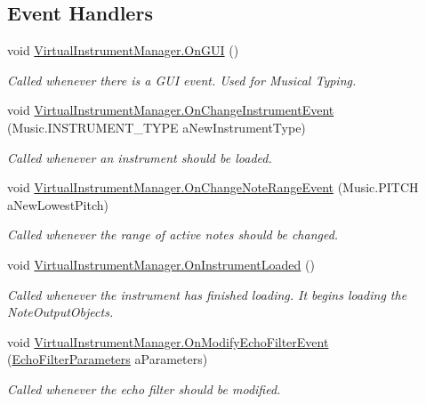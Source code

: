 \subsection*{Event Handlers}
\begin{DoxyCompactItemize}
\item 
void \hyperlink{group___virtual_instrument_manager_event_types_gac64ceff10f8db3a11868f251cea72349}{Virtual\+Instrument\+Manager.\+On\+G\+UI} ()
\begin{DoxyCompactList}\small\item\em Called whenever there is a G\+UI event. Used for Musical Typing. \end{DoxyCompactList}\item 
void \hyperlink{group___virtual_instrument_manager_event_types_ga8e79286073756c31e08fecd59ce04fa7}{Virtual\+Instrument\+Manager.\+On\+Change\+Instrument\+Event} (Music.\+I\+N\+S\+T\+R\+U\+M\+E\+N\+T\+\_\+\+T\+Y\+PE a\+New\+Instrument\+Type)
\begin{DoxyCompactList}\small\item\em Called whenever an instrument should be loaded. \end{DoxyCompactList}\item 
void \hyperlink{group___virtual_instrument_manager_event_types_ga660c766dceebfc830de2cf96686692df}{Virtual\+Instrument\+Manager.\+On\+Change\+Note\+Range\+Event} (Music.\+P\+I\+T\+CH a\+New\+Lowest\+Pitch)
\begin{DoxyCompactList}\small\item\em Called whenever the range of active notes should be changed. \end{DoxyCompactList}\item 
void \hyperlink{group___virtual_instrument_manager_event_types_gac7d5b65484e450a400e32ab416ebc9f6}{Virtual\+Instrument\+Manager.\+On\+Instrument\+Loaded} ()
\begin{DoxyCompactList}\small\item\em Called whenever the instrument has finished loading. It begins loading the Note\+Output\+Objects. \end{DoxyCompactList}\item 
void \hyperlink{group___virtual_instrument_manager_event_types_gae504c6ded8eb68ffb117c207fc25d99d}{Virtual\+Instrument\+Manager.\+On\+Modify\+Echo\+Filter\+Event} (\hyperlink{group___virtual_instrument_manager_event_types_struct_virtual_instrument_manager_1_1_echo_filter_parameters}{Echo\+Filter\+Parameters} a\+Parameters)
\begin{DoxyCompactList}\small\item\em Called whenever the echo filter should be modified. \end{DoxyCompactList}\item 

\end{DoxyCompactItemize}
